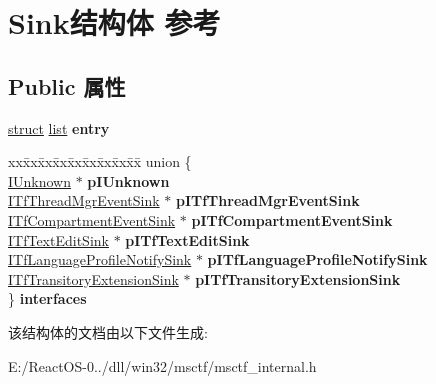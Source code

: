 \hypertarget{struct_sink}{}\section{Sink结构体 参考}
\label{struct_sink}
\subsection*{Public 属性}
\begin{DoxyCompactItemize}
\item 
\mbox{\label{struct_sink_a9470e0ad3692efc858f837866f6f943c}} 
\hyperlink{interfacestruct}{struct} \hyperlink{classlist}{list} {\bfseries entry}
\item 
\mbox{\label{struct_sink_a83d830ccac8a04b3e640fcdad8511b0f}} 
\begin{tabbing}
xx\=xx\=xx\=xx\=xx\=xx\=xx\=xx\=xx\=\kill
union \{\\
\>\hyperlink{interface_i_unknown}{IUnknown} $\ast$ {\bfseries pIUnknown}\\
\>\hyperlink{interface_i_tf_thread_mgr_event_sink}{ITfThreadMgrEventSink} $\ast$ {\bfseries pITfThreadMgrEventSink}\\
\>\hyperlink{interface_i_tf_compartment_event_sink}{ITfCompartmentEventSink} $\ast$ {\bfseries pITfCompartmentEventSink}\\
\>\hyperlink{interface_i_tf_text_edit_sink}{ITfTextEditSink} $\ast$ {\bfseries pITfTextEditSink}\\
\>\hyperlink{interface_i_tf_language_profile_notify_sink}{ITfLanguageProfileNotifySink} $\ast$ {\bfseries pITfLanguageProfileNotifySink}\\
\>\hyperlink{interface_i_tf_transitory_extension_sink}{ITfTransitoryExtensionSink} $\ast$ {\bfseries pITfTransitoryExtensionSink}\\
\} {\bfseries interfaces}\\

\end{tabbing}\end{DoxyCompactItemize}


该结构体的文档由以下文件生成\+:\begin{DoxyCompactItemize}
\item 
E\+:/\+React\+O\+S-\/0../dll/win32/msctf/msctf\+\_\+internal.\+h\end{DoxyCompactItemize}
